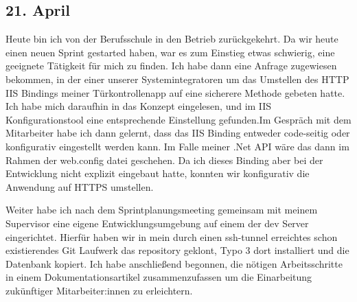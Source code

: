 \subsection{21. April}
Heute bin ich von der Berufsschule in den Betrieb zurückgekehrt. Da wir heute einen neuen Sprint gestarted haben, war es zum Einstieg etwas schwierig, eine geeignete Tätigkeit für mich zu finden. Ich habe dann eine Anfrage zugewiesen bekommen, in der einer unserer Systemintegratoren um das Umstellen des HTTP IIS Bindings meiner Türkontrollenapp auf eine sicherere Methode gebeten hatte. Ich habe mich daraufhin in das Konzept eingelesen, und im IIS Konfigurationstool eine entsprechende Einstellung gefunden.Im Gespräch mit dem Mitarbeiter habe ich dann gelernt, dass das IIS Binding entweder code-seitig oder konfigurativ eingestellt werden kann. Im Falle meiner .Net API wäre das dann im Rahmen der web.config datei geschehen. Da ich dieses Binding aber bei der Entwicklung nicht explizit eingebaut hatte, konnten wir konfigurativ die Anwendung auf HTTPS umstellen.

Weiter habe ich nach dem Sprintplanungsmeeting gemeinsam mit meinem Supervisor eine eigene Entwicklungsumgebung auf einem der dev Server eingerichtet. Hierfür haben wir in mein durch einen ssh-tunnel erreichtes schon existierendes Git Laufwerk das repository geklont, Typo 3 dort installiert und die Datenbank kopiert. Ich habe anschließend begonnen, die nötigen Arbeitsschritte in einem Dokumentationsartikel zusammenzufassen um die Einarbeitung zukünftiger Mitarbeiter:innen zu erleichtern.